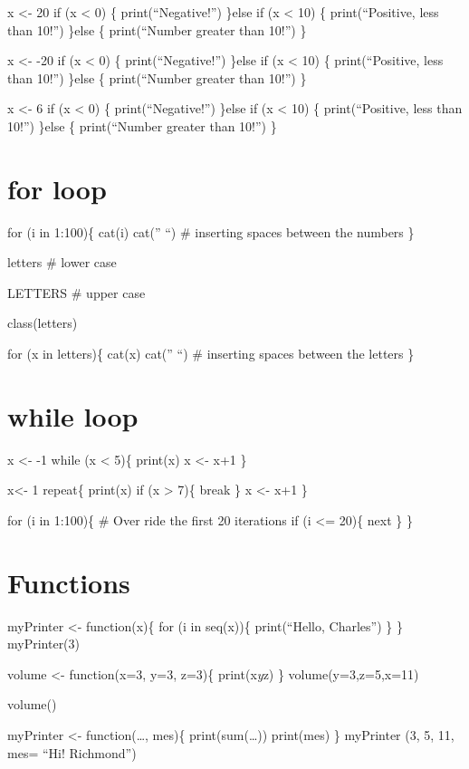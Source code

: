 \documentclass[
]{article}
\begin{document}
x \textless- 20 if (x \textless{} 0) \{ print(``Negative!'') \}else if
(x \textless{} 10) \{ print(``Positive, less than 10!'') \}else \{
print(``Number greater than 10!'') \}

x \textless- -20 if (x \textless{} 0) \{ print(``Negative!'') \}else if
(x \textless{} 10) \{ print(``Positive, less than 10!'') \}else \{
print(``Number greater than 10!'') \}

x \textless- 6 if (x \textless{} 0) \{ print(``Negative!'') \}else if (x
\textless{} 10) \{ print(``Positive, less than 10!'') \}else \{
print(``Number greater than 10!'') \}

\section{for loop}\label{for-loop}

for (i in 1:100)\{ cat(i) cat('' ``) \# inserting spaces between the
numbers \}

letters \# lower case

LETTERS \# upper case

class(letters)

for (x in letters)\{ cat(x) cat('' ``) \# inserting spaces between the
letters \}

\section{while loop}\label{while-loop}

x \textless- -1 while (x \textless{} 5)\{ print(x) x \textless- x+1 \}

x\textless- 1 repeat\{ print(x) if (x \textgreater{} 7)\{ break \} x
\textless- x+1 \}

for (i in 1:100)\{ \# Over ride the first 20 iterations if (i \textless=
20)\{ next \} \}

\section{Functions}\label{functions}

myPrinter \textless- function(x)\{ for (i in seq(x))\{ print(``Hello,
Charles'') \} \} myPrinter(3)

volume \textless- function(x=3, y=3, z=3)\{ print(x\emph{y}z) \}
volume(y=3,z=5,x=11)

volume()

myPrinter \textless- function(\ldots, mes)\{ print(sum(\ldots))
print(mes) \} myPrinter (3, 5, 11, mes= ``Hi! Richmond'')
\end{document}
